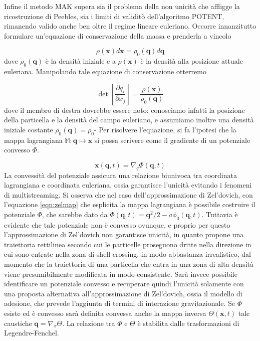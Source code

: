 Infine il metodo MAK supera sia il problema della non unicità che affligge la ricostruzione di Peebles, 
sia i limiti di validitò dell'algoritmo POTENT, rimanendo valido anche ben oltre il regime lineare euleriano.
Occorre innanzitutto formulare un'equazione di conservazione della massa e prenderla a vincolo

\begin{equation}
    \rho(\bm{x})d\bm{x} = \rho_0(\bm{q})d\bm{q}
\end{equation}
dove $\rho_0(\bm{q})$ è la densità iniziale e a $\rho(\bm{x})$ è la densità alla posizione attuale euleriana.
Manipolando tale equazione di conservazione otterremo 

\begin{equation}
    \label{eqn:masscons}
    \det\left[\frac{\partial q_i}{\partial x_j}\right] = \frac{\rho(\bm{x})}{\rho_0(\bm{q})}
\end{equation}
dove il membro di destra dovrebbe essere noto: conosciamo infatti la posizione della particella
e la densità del campo euleriano, e assumiamo inoltre una densità iniziale costante $\rho_0(\bm{q}) = \rho_0$-
Per risolvere l'equazione, si fa l'ipotesi che la mappa lagrangiana $\mathbb{M}: \bm{q} \mapsto \bm{x}$ si 
possa scrivere come il gradiente di un potenziale convesso $\Phi$.

\begin{equation}
    \bm{x}(\bm{q}, t) = \nabla_q \Phi(\bm{q}, t)
\end{equation}
La convessità del potenziale assicura una relazione biunivoca tra coordinata lagrangiana e coordinata
euleriana, ossia garantisce l'unicità evitando i fenomeni di multistreaming.
Si osserva che nel caso dell'approssimazione di Zel'dovich, con l'equazione \ref{eqn:zelmap} che esplicita la 
mappa lagrangiana è possibile costruire il potenziale $\Phi$, che sarebbe dato da 
$\Phi(\bm{q}, t) = \bm{q}^2/2 -a\phi_0(\bm{q}, t)$.
Tuttavia è evidente che tale potenziale non è convesso ovunque, e proprio per questo l'approssimazione
di Zel'dovich non garantisce unicità, in quanto propone una traiettoria rettilinea secondo cui le particelle 
proseguono dritte nella direzione in cui sono entrate nella zona di shell-crossing, in modo abbastanza irrealistico,
dal momento che la traiettoria di una particella che entra in una zona di alta densità viene presumibilmente modificata in modo 
consistente. 
Sarà invece possibile identificare un potenziale convesso e recuperare quindi l'unicità solamente con una proposta 
alternativa all'approssimazione di Zel'dovich, ossia il modello di adesione, che prevede l'aggiunta di 
termini di interazione gravitazionale.
Se $\Phi$ esiste ed è convesso sarà definita convessa anche la mappa inversa $\Theta(\bm{x}, t)$ tale caustiche
$\bm{q} = \nabla_x \Theta$. La relazione tra $\Phi$ e $\Theta$ è stabilita dalle trasformazioni di
Legendre-Fenchel.

